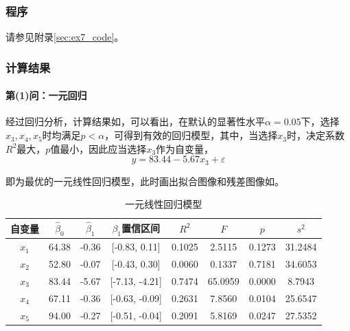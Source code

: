 \subsubsection{程序}

请参见附录\ref{sec:ex7_code}。

\subsubsection{计算结果}

\paragraph{第(1)问：一元回归} 经过回归分析，计算结果如，可以看出，在默认的显著性水平$\alpha=0.05$下，选择$x_3,x_4,x_5$时均满足$p<\alpha$，可得到有效的回归模型，其中，当选择$x_3$时，决定系数$R^2$最大，$p$值最小，因此应当选择$x_3$作为自变量，
\begin{equation}\label{eq:ex7_single_best}
    y = 83.44 - 5.67 x_3 + \varepsilon
\end{equation}

即为最优的一元线性回归模型，此时画出拟合图像和残差图像如。

\begin{table}[H]
    \centering
    \caption{一元线性回归模型}
    \label{tab:ex7_regress_single}
    \begin{tabular}{c|ccccccc}
        \toprule
        自变量 & \(\hat{\beta}_0\) & \(\hat{\beta}_1\) & \(\beta_1\)置信区间 & \(R^2\) &
        \(F\) & \(p\) & \(s^2\)\tabularnewline
        \midrule
        \(x_1\) & 64.38 & -0.36 & [-0.83, 0.11] & 0.1025 & 2.5115 & 0.1273 &
        31.2484\tabularnewline
        \(x_2\) & 52.80 & -0.07 & [-0.43, 0.30] & 0.0060 & 0.1337 & 0.7181 &
        34.6053\tabularnewline
        \(x_3\) & 83.44 & -5.67 & [-7.13, -4.21] & 0.7474 & 65.0959 & 0.0000
        & 8.7943\tabularnewline
        \(x_4\) & 67.11 & -0.36 & [-0.63, -0.09] & 0.2631 & 7.8560 & 0.0104 &
        25.6547\tabularnewline
        \(x_5\) & 94.00 & -0.27 & [-0.51, -0.04] & 0.2091 & 5.8169 & 0.0247 &
        27.5352\tabularnewline
        \bottomrule
    \end{tabular}
\end{table}

